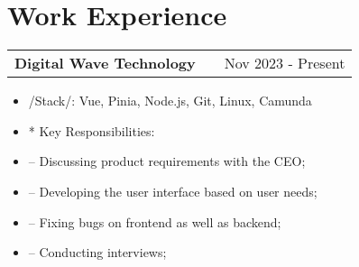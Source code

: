 \documentclass[a4paper,12pt]{article}
\makeatletter
\newenvironment{joblong}[2]
    {
    \begin{tabularx}{\linewidth}{@{}l X r@{}}
    \textbf{#1} & \hfill &  #2 \\[3.75pt]
    \end{tabularx}
    \begin{minipage}[t]{\linewidth}
    \begin{itemize}[nosep,after=\strut, leftmargin=1em, itemsep=3pt,label=--]
    }
    {
    \end{itemize}
    \end{minipage}    
    }
\makeatother
\begin{document}
\section{Work Experience}

\begin{joblong}{Digital Wave Technology}{Nov 2023 - Present}
  \item /Stack/: {Vue, Pinia, Node.js, Git, Linux, Camunda}
  
  \item [*] Key Responsibilities:
  \item [--] Discussing product requirements with the CEO;
  \item [--] Developing the user interface based on user needs;
  \item [--] Fixing bugs on frontend as well as backend;
  \item [--] Conducting interviews;

\end{joblong}
\end{document}

